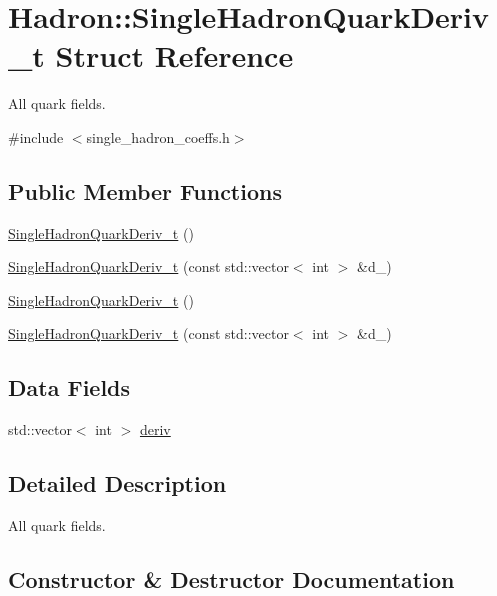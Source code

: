 \hypertarget{structHadron_1_1SingleHadronQuarkDeriv__t}{}\section{Hadron\+:\+:Single\+Hadron\+Quark\+Deriv\+\_\+t Struct Reference}
\label{structHadron_1_1SingleHadronQuarkDeriv__t}


All quark fields.  




{\ttfamily \#include $<$single\+\_\+hadron\+\_\+coeffs.\+h$>$}

\subsection*{Public Member Functions}
\begin{DoxyCompactItemize}
\item 
\mbox{\hyperlink{structHadron_1_1SingleHadronQuarkDeriv__t_ada7d1ddc236b6bdac2c9c737247490e4}{Single\+Hadron\+Quark\+Deriv\+\_\+t}} ()
\item 
\mbox{\hyperlink{structHadron_1_1SingleHadronQuarkDeriv__t_aa7239c485a6348276814f945fe15139c}{Single\+Hadron\+Quark\+Deriv\+\_\+t}} (const std\+::vector$<$ int $>$ \&d\+\_\+)
\item 
\mbox{\hyperlink{structHadron_1_1SingleHadronQuarkDeriv__t_ada7d1ddc236b6bdac2c9c737247490e4}{Single\+Hadron\+Quark\+Deriv\+\_\+t}} ()
\item 
\mbox{\hyperlink{structHadron_1_1SingleHadronQuarkDeriv__t_aa7239c485a6348276814f945fe15139c}{Single\+Hadron\+Quark\+Deriv\+\_\+t}} (const std\+::vector$<$ int $>$ \&d\+\_\+)
\end{DoxyCompactItemize}
\subsection*{Data Fields}
\begin{DoxyCompactItemize}
\item 
std\+::vector$<$ int $>$ \mbox{\hyperlink{structHadron_1_1SingleHadronQuarkDeriv__t_a20101dafcfaf3f8294f11c87ec3445c6}{deriv}}
\end{DoxyCompactItemize}


\subsection{Detailed Description}
All quark fields. 

\subsection{Constructor \& Destructor Documentation}
\mbox{\label{structHadron_1_1SingleHadronQuarkDeriv__t_ada7d1ddc236b6bdac2c9c737247490e4}} 
